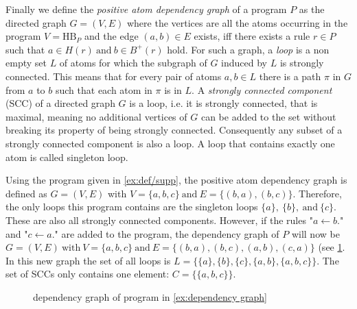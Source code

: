 Finally we define the \emph{positive atom dependency graph} of a program $P$ as the directed graph \(G = (V, E)\) where the vertices are all the atoms occurring in the program \(V = \text{HB}_P\) and the edge \((a,b) \in E\) exists, iff there exists a rule \(r \in P\) such that \(a \in H(r) \ \text{and}\ b \in B^+(r)\) hold.
For such a graph, a \emph{loop} is a non empty set $L$ of atoms for which the subgraph of $G$ induced by $L$ is strongly connected. This means that for every pair of atoms \(a,b \in L\) there is a path $\pi$ in $G$ from $a$ to $b$ such that each atom in $\pi$ is in $L$.
A \emph{strongly connected component} (SCC) of a directed graph $G$ is a loop, i.e. it is strongly connected, that is maximal, meaning no additional vertices of $G$ can be added to the set without breaking its property of being strongly connected. Consequently any subset of a strongly connected component is also a loop.
A loop that contains exactly one atom is called singleton loop.
\begin{example}
\label{ex:dependency graph}
    Using the program given in \cref{ex:def/supp}, the positive atom dependency graph is defined as \(G = (V, E)\) with \(V = \{a, b, c\}\ \text{and}\ E = \{(b, a), (b, c)\}\). Therefore, the only loops this program contains are the singleton loops \(\{a\},\ \{b\},\ \text{and}\ \{c\}\). These are also all strongly connected components. 
    However, if the rules "\(a \leftarrow b.\)" and "\(c \leftarrow a.\)" are added to the program, the dependency graph of $P$ will now be \(G = (V, E)\ \text{with}\ V = \{a,b,c\}\ \text{and}\ E = \{(b,a), (b,c), (a,b), (c,a)\}\) (see \cref{fig:dependency graph}. In this new graph the set of all loops is \(L = \{\{a\},\{b\},\{c\},\{a,b\},\{a,b,c\}\}\). The set of SCCs only contains one element: \(C = \{\{a,b,c\}\}\).
\end{example}

\begin{figure}[h]
    \centering
    \caption{dependency graph of program in \cref{ex:dependency graph}}
    \label{fig:dependency graph}
\end{figure}


